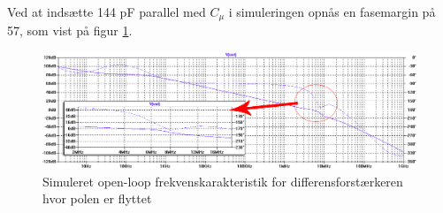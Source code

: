 Ved at indsætte 144 pF parallel med $C_\mu$ i simuleringen opnås en fasemargin på 57\degrees, som vist på figur \ref{openloop_efter_korrektion}.

\begin{figure}[h]
\centering
\includegraphics[width=\textwidth]{teknisk/effektforstaerker/stabilitet-medc-graf.png}
\caption{Simuleret open-loop frekvenskarakteristik for differensforstærkeren hvor polen er flyttet}
\label{openloop_efter_korrektion}
\end{figure}